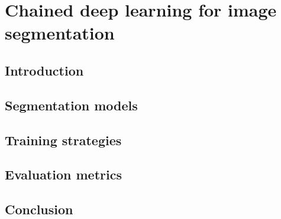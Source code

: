 \chapter{Chained deep learning for image
segmentation}\label{ch:chained_deep_learning_seg}

\section{Introduction}

\section{Segmentation models}

\section{Training strategies}

\section{Evaluation metrics}

\section{Conclusion}
